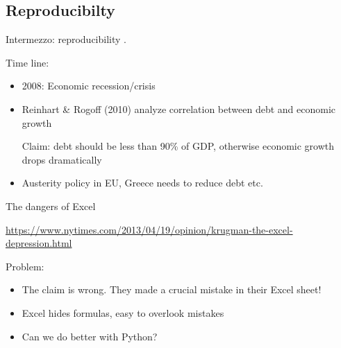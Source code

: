 \documentclass[aspectratio=169,usenames,dvipsnames]{beamer}
\begin{document}
\subsection{Reproducibilty}
\frame{\tableofcontents[currentsubsection]}

\begin{frame}{Intermezzo: reproducibility}
    .

    Time line:
    \begin{itemize}
        \item 2008: Economic recession/crisis
        \item Reinhart \& Rogoff (2010) analyze correlation between debt and
            economic growth \\
            \begin{block}{Claim:}
            debt should be less than 90\% of GDP, otherwise economic growth
                drops dramatically
            \end{block}
        \item Austerity policy in EU, Greece needs to reduce debt etc.
    \end{itemize}
\end{frame}

\begin{frame}{The dangers of Excel}
    \begin{reference}
    \url{https://www.nytimes.com/2013/04/19/opinion/krugman-the-excel-depression.html}
    \end{reference}

    Problem:
    \begin{itemize}
        \item The claim is wrong.
            They made a crucial mistake in their Excel sheet!
        \item Excel hides formulas, easy to overlook mistakes
        \item Can we do better with Python?
    \end{itemize}

\end{frame}
\end{document}
